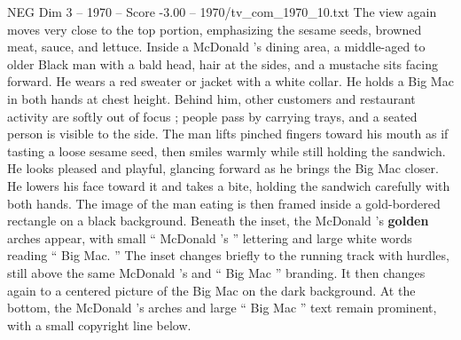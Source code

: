 \begin{textsample}{NEG Dim 3 – 1970 – Score -3.00 – 1970/tv\_com\_1970\_10.txt}
The view again moves very close to the top portion, emphasizing the sesame seeds, browned meat, sauce, and lettuce.
Inside a McDonald ’s dining area, a middle-aged to older Black man with a bald head, hair at the sides, and a mustache sits facing forward.
He wears a red sweater or jacket with a white collar.
He holds a Big Mac in both hands at chest height.
Behind him, other customers and restaurant activity are softly out of focus ; people pass by carrying trays, and a seated person is visible to the side.
The man lifts pinched fingers toward his mouth as if tasting a loose sesame seed, then smiles warmly while still holding the sandwich.
He looks pleased and playful, glancing forward as he brings the Big Mac closer.
He lowers his face toward it and takes a bite, holding the sandwich carefully with both hands.
The image of the man eating is then framed inside a gold-bordered rectangle on a black background.
Beneath the inset, the McDonald ’s \textbf{golden} arches appear, with small “ McDonald ’s ” lettering and large white words reading “ Big Mac. ” The inset changes briefly to the running track with hurdles, still above the same McDonald ’s and “ Big Mac ” branding.
It then changes again to a centered picture of the Big Mac on the dark background.
At the bottom, the McDonald ’s arches and large “ Big Mac ” text remain prominent, with a small copyright line below.

\end{textsample}
